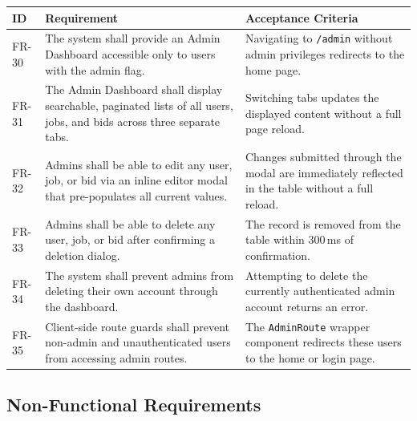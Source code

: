 \documentclass[11pt]{article}
\begin{document}
\begin{longtable}{@{}p{1.8cm}p{5.8cm}p{5.8cm}@{}}
\toprule
\textbf{ID} & \textbf{Requirement} & \textbf{Acceptance Criteria} \\
\midrule
\endhead
FR-30 & The system shall provide an Admin Dashboard accessible only to users with the admin flag. & Navigating to \texttt{/admin} without admin privileges redirects to the home page. \\
\midrule
FR-31 & The Admin Dashboard shall display searchable, paginated lists of all users, jobs, and bids across three separate tabs. & Switching tabs updates the displayed content without a full page reload. \\
\midrule
FR-32 & Admins shall be able to edit any user, job, or bid via an inline editor modal that pre-populates all current values. & Changes submitted through the modal are immediately reflected in the table without a full reload. \\
\midrule
FR-33 & Admins shall be able to delete any user, job, or bid after confirming a deletion dialog. & The record is removed from the table within 300\,ms of confirmation. \\
\midrule
FR-34 & The system shall prevent admins from deleting their own account through the dashboard. & Attempting to delete the currently authenticated admin account returns an error. \\
\midrule
FR-35 & Client-side route guards shall prevent non-admin and unauthenticated users from accessing admin routes. & The \texttt{AdminRoute} wrapper component redirects these users to the home or login page. \\
\bottomrule
\end{longtable}

\subsection{Non-Functional Requirements}
\end{document}
